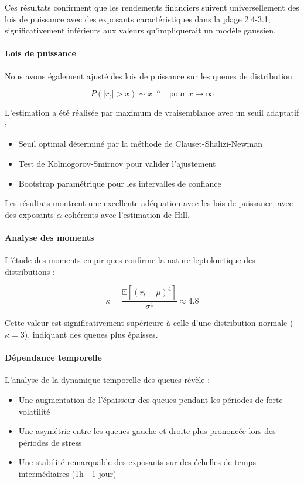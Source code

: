 \documentclass[12pt,a4paper]{article}
\theoremstyle{definition}
\theoremstyle{remark}
\begin{document}
Ces résultats confirment que les rendements financiers suivent universellement des lois de puissance avec des exposants caractéristiques dans la plage 2.4-3.1, significativement inférieurs aux valeurs qu'impliquerait un modèle gaussien.

\paragraph{Lois de puissance}
Nous avons également ajusté des lois de puissance sur les queues de distribution :

\begin{equation}
P(|r_t| > x) \sim x^{-\alpha} \quad \text{pour } x \to \infty
\end{equation}

L'estimation a été réalisée par maximum de vraisemblance avec un seuil adaptatif :

\begin{itemize}
    \item Seuil optimal déterminé par la méthode de Clauset-Shalizi-Newman
    \item Test de Kolmogorov-Smirnov pour valider l'ajustement
    \item Bootstrap paramétrique pour les intervalles de confiance
\end{itemize}

Les résultats montrent une excellente adéquation avec les lois de puissance, avec des exposants $\alpha$ cohérents avec l'estimation de Hill.

\paragraph{Analyse des moments}
L'étude des moments empiriques confirme la nature leptokurtique des distributions :

\begin{equation}
\kappa = \frac{\mathbb{E}[(r_t - \mu)^4]}{\sigma^4} \approx 4.8
\end{equation}

Cette valeur est significativement supérieure à celle d'une distribution normale ($\kappa = 3$), indiquant des queues plus épaisses.

\paragraph{Dépendance temporelle}
L'analyse de la dynamique temporelle des queues révèle :

\begin{itemize}
    \item Une augmentation de l'épaisseur des queues pendant les périodes de forte volatilité
    \item Une asymétrie entre les queues gauche et droite plus prononcée lors des périodes de stress
    \item Une stabilité remarquable des exposants sur des échelles de temps intermédiaires (1h - 1 jour)
\end{itemize}
\end{document}
